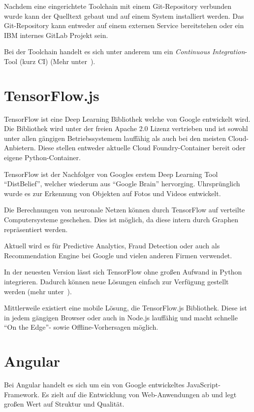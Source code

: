 Nachdem eine eingerichtete Toolchain mit einem Git-Repository verbunden wurde kann der Quelltext gebaut und auf einem
System installiert werden. Das Git-Repository kann entweder auf einem externen Service bereitstehen oder ein IBM internes
GitLab Projekt sein.

Bei der Toolchain handelt es sich unter anderem um ein \textit{Continuous Integration}-Tool (kurz CI)
(Mehr unter~\cite{online_grundlagen_toolchain}).

\section{TensorFlow.js}
TensorFlow ist eine Deep Learning Bibliothek welche von Google entwickelt wird. Die Bibliothek wird unter der freien
Apache 2.0 Lizenz vertrieben und ist sowohl unter allen gängigen Betriebssystemem lauffähig als auch bei den meisten
Cloud-Anbietern. Diese stellen entweder aktuelle Cloud Foundry-Container bereit oder eigene Python-Container.

TensorFlow ist der Nachfolger von Googles erstem Deep Learning Tool \enquote{DistBelief}, welcher wiederum aus
\enquote{Google Brain} hervorging. Uhrsprünglich wurde es zur Erkennung von Objekten auf Fotos und Videos entwickelt.

Die Berechnungen von neuronale Netzen können durch TensorFlow auf verteilte Computersysteme geschehen. Dies ist möglich,
da diese intern durch Graphen repräsentiert werden.

Aktuell wird es für Predictive Analytics, Fraud Detection oder auch als Recommendation Engine bei Google und vielen
anderen Firmen verwendet.

In der neuesten Version lässt sich TensorFlow ohne großen Aufwand in Python integrieren. Dadurch können neue Lösungen
einfach zur Verfügung gestellt werden (mehr unter~\cite{book_grundlagen_tensorflow}).

Mittlerweile existiert eine mobile Lösung, die TensorFlow.js Bibliothek. Diese ist in jedem gängigen Browser oder auch
in Node.js lauffähig und macht schnelle \enquote{On the Edge}- sowie Offline-Vorhersagen möglich.

\section{Angular}
Bei Angular handelt es sich um ein von Google entwickeltes JavaScript-Framework. Es zielt auf die Entwicklung von
Web-Anwendungen ab und legt großen Wert auf Struktur und Qualität.

